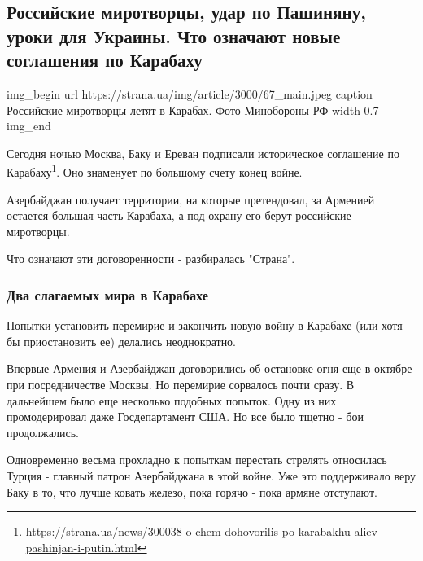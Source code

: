  
 
 

\subsection{Российские миротворцы, удар по Пашиняну, уроки для Украины. Что означают новые соглашения по Карабаху}


\ifcmt
img_begin 
	url https://strana.ua/img/article/3000/67_main.jpeg
	caption Российские миротворцы летят в Карабах. Фото Минобороны РФ 
	width 0.7
img_end
\fi

Сегодня ночью Москва, Баку и Ереван подписали историческое соглашение по
Карабаху\footnote{\url{https://strana.ua/news/300038-o-chem-dohovorilis-po-karabakhu-aliev-pashinjan-i-putin.html}}.
Оно знаменует по большому счету конец войне.

Азербайджан получает территории, на которые претендовал, за Арменией остается
большая часть Карабаха, а под охрану его берут российские миротворцы. 

Что означают эти договоренности - разбиралась "Страна". 

\subsubsection{Два слагаемых мира в Карабахе}

Попытки установить перемирие и закончить новую войну в Карабахе (или хотя бы
приостановить ее) делались неоднократно.

Впервые Армения и Азербайджан договорились об остановке огня еще в октябре при
посредничестве Москвы. Но перемирие сорвалось почти сразу. В дальнейшем было
еще несколько подобных попыток. Одну из них промодерировал даже Госдепартамент
США. Но все было тщетно - бои продолжались.

Одновременно весьма прохладно к попыткам перестать стрелять относилась Турция -
главный патрон Азербайджана в этой войне. Уже это поддерживало веру Баку в то,
что лучше ковать железо, пока горячо - пока армяне отступают. 


